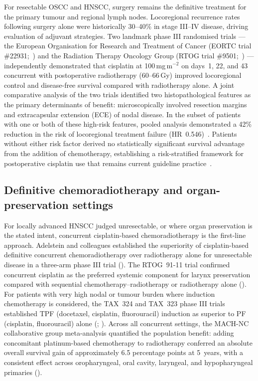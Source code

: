 \documentclass[preprint,review,12pt]{elsarticle}
\begin{document}
For resectable OSCC and HNSCC, surgery remains the definitive treatment for
the primary tumour and regional lymph nodes. Locoregional recurrence rates
following surgery alone were historically 30--40\% in stage III--IV disease,
driving evaluation of adjuvant strategies. Two landmark phase III randomised
trials --- the European Organisation for Research and Treatment of Cancer
(EORTC trial \#22931;~\cite{Bernier2004}) and the
Radiation Therapy Oncology Group (RTOG trial \#9501;~\cite{Cooper2004}) ---
independently demonstrated that cisplatin at 100\,mg\,m$^{-2}$ on days~1,
22, and 43 concurrent with postoperative radiotherapy (60--66\,Gy) improved
locoregional control and disease-free survival compared with radiotherapy
alone. A joint comparative analysis of the two trials identified two
histopathological features as the primary determinants of benefit:
microscopically involved resection margins and extracapsular extension (ECE)
of nodal disease. In the subset of patients with one or both of these
high-risk features, pooled analysis demonstrated a 42\% reduction in the
risk of locoregional treatment failure (HR~0.546)~\cite{Bernier2005}.
Patients without either risk factor derived no statistically significant
survival advantage from the addition of chemotherapy, establishing a
risk-stratified framework for postoperative cisplatin use that remains
current guideline practice~\cite{Bernier2005}.

\subsection{Definitive chemoradiotherapy and organ-preservation settings}

For locally advanced HNSCC judged unresectable, or where organ preservation
is the stated intent, concurrent cisplatin-based chemoradiotherapy is the
first-line approach. Adelstein and colleagues established the superiority of
cisplatin-based definitive concurrent chemoradiotherapy over radiotherapy
alone for unresectable disease in a three-arm phase III trial
(\cite{Adelstein2003}).
The RTOG~91-11 trial confirmed concurrent cisplatin as the preferred
systemic component for larynx preservation compared with sequential
chemotherapy--radiotherapy or radiotherapy alone
(\cite{Forastiere2003}).
For patients with very high nodal or tumour burden where induction
chemotherapy is considered, the TAX~324 and TAX~323 phase III trials
established TPF (docetaxel, cisplatin, fluorouracil) induction as superior
to PF (cisplatin, fluorouracil) alone
(\cite{Posner2007}; \cite{Vermorken2007}).
Across all concurrent settings, the MACH-NC collaborative group
meta-analysis quantified the population benefit: adding concomitant
platinum-based chemotherapy to radiotherapy conferred an absolute overall
survival gain of approximately 6.5 percentage points at 5~years, with a
consistent effect across oropharyngeal, oral cavity, laryngeal, and
hypopharyngeal primaries (\cite{Pignon2009}).
\end{document}
